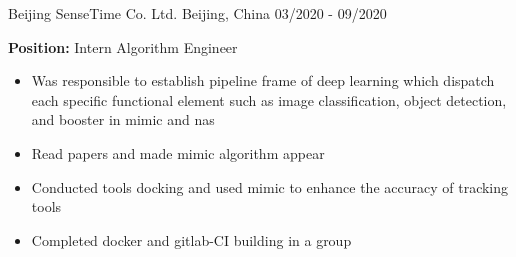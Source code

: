 

\begin{cventries}
  
  \cventry
    {}
    {Beijing SenseTime Co. Ltd.}
    {Beijing, China}
    {03/2020 - 09/2020}
    {
      \textbf{Position:} Intern Algorithm Engineer
      \begin{itemize}
        \item {Was responsible to establish pipeline frame of deep learning which dispatch each specific functional element such as image classification, object detection, and booster in mimic and nas}
        \item {Read papers and made mimic algorithm appear}
        \item {Conducted tools docking and used mimic to enhance the accuracy of tracking tools}
        \item {Completed docker and gitlab-CI building in a group}
      \end{itemize}
    }


\end{cventries}
